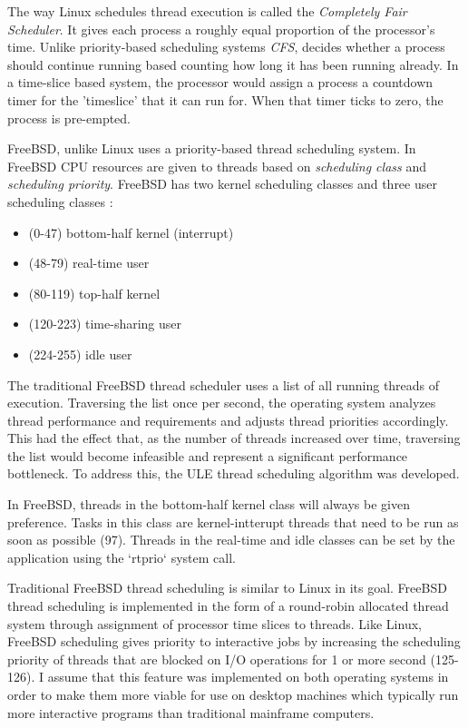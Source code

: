 \documentclass[onecolumn,10pt]{IEEETran}
\begin{document}
	The way Linux schedules thread execution is called the \textit{Completely Fair Scheduler}.  It gives each process a roughly equal proportion of the processor's time.  Unlike priority-based scheduling systems \textit{CFS}, decides whether a process should continue running based counting how long it has been running already.  In a time-slice based system, the processor would assign a process a countdown timer for the 'timeslice' that it can run for.  When that timer ticks to zero, the process is pre-empted.

	FreeBSD, unlike Linux uses a priority-based thread scheduling system.  In FreeBSD CPU resources are given to threads based on \textit{scheduling class} and \textit{scheduling priority}.  FreeBSD has two kernel scheduling classes and three user scheduling classes \cite{freebsd} :
		\begin{itemize}
			\item (0-47) bottom-half kernel (interrupt)
			\item (48-79) real-time user
			\item (80-119) top-half kernel
			\item (120-223) time-sharing user
			\item (224-255) idle user
		\end{itemize}

	The traditional FreeBSD thread scheduler uses a list of all running threads of execution.  Traversing the list once per second, the operating system analyzes thread performance and requirements and adjusts thread priorities accordingly.  This had the effect that, as the number of threads increased over time, traversing the list would become infeasible and represent a significant performance bottleneck.  To address this, the ULE thread scheduling algorithm was developed.\cite{freebsd-proc} 

	In FreeBSD, threads in the bottom-half kernel class will always be given preference.  Tasks in this class are kernel-intterupt threads that need to be run as soon as possible (97).  Threads in the real-time and idle classes can be set by the application using the `rtprio` system call.

	Traditional FreeBSD thread scheduling is similar to Linux in its goal.  FreeBSD thread scheduling is implemented in the form of a round-robin allocated thread system through assignment of processor time slices to threads.  Like Linux, FreeBSD scheduling gives priority to interactive jobs by increasing the scheduling priority of threads that are blocked on I/O operations for 1 or more second (125-126).  I assume that this feature was implemented on both operating systems in order to make them more viable for use on desktop machines which typically run more interactive programs than traditional mainframe computers.
\end{document}
